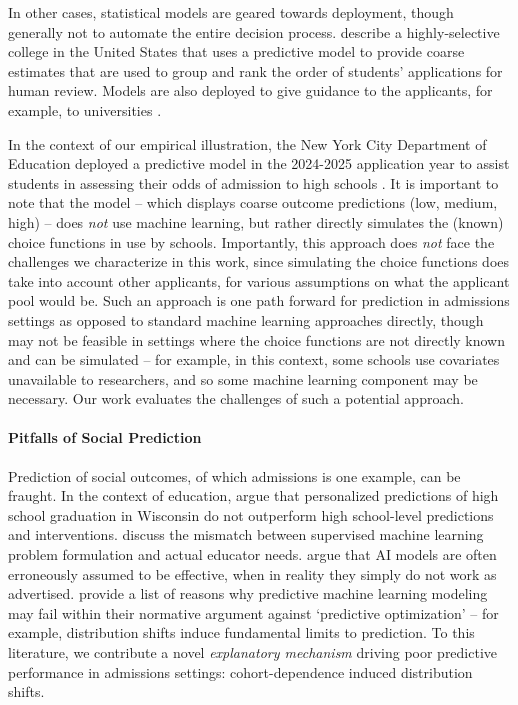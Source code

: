 \documentclass[letterpaper]{article}
\begin{document}
In other cases, statistical models are geared towards deployment, though generally not to automate the entire decision process.
\citet{lee2023evaluating} describe a highly-selective college in the United States that uses a predictive model to provide coarse estimates that are used to group and rank the order of students' applications for human review.
Models are also deployed to give guidance to the applicants, for example, to universities \citep{sirolly2024impact,collegevine}.

In the context of our empirical illustration, the New York City Department of Education deployed a predictive model in the 2024-2025 application year to assist students in assessing their odds of admission to high schools \cite{ShenBerro2024HighSchoolAdmissions}.
It is important to note that the model -- which displays coarse outcome predictions (low, medium, high) -- does \textit{not} use machine learning, but rather directly simulates the (known) choice functions in use by schools. Importantly, this approach does \textit{not} face the challenges we characterize in this work, since simulating the choice functions does take into account other applicants, for various assumptions on what the applicant pool would be. Such an approach is one path forward for prediction in admissions settings as opposed to standard machine learning approaches directly, though may not be feasible in settings where the choice functions are not directly known and can be simulated -- for example, in this context, some schools use covariates unavailable to researchers, and so some machine learning component may be necessary. Our work evaluates the challenges of such a potential approach.

\paragraph{Pitfalls of Social Prediction}

Prediction of social outcomes, of which admissions is one example, can be fraught.
In the context of education, \citet{perdomo2025difficult} argue that personalized predictions of high school graduation in Wisconsin do not outperform high school-level predictions and interventions.
\citet{liu2023reimagining} discuss the mismatch between supervised machine learning problem formulation and actual educator needs. \citet{raji2022fallacy} argue that AI models are often erroneously assumed to be effective, when in reality they simply do not work as advertised. \citet{wang2024against} provide a list of reasons why predictive machine learning modeling may fail within their normative argument against `predictive optimization' -- for example, distribution shifts induce fundamental limits to prediction. To this literature, we contribute a novel \textit{explanatory mechanism} driving poor predictive performance in admissions settings: cohort-dependence induced distribution shifts.
\end{document}
